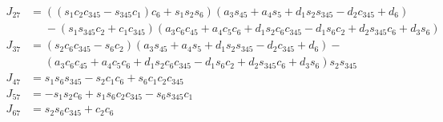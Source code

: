\documentclass{article}
\begin{document}
\begin{align*}
J_{27} &= \left(\left(s_{1} c_{2} c_{345} - s_{345} c_{1}\right) c_{6} + s_{1} s_{2} s_{6}\right) \left(a_{3} s_{45} + a_{4} s_{5} + d_{1} s_{2} s_{345} - d_{2} c_{345} + d_{6}\right) \\
       &\phantom{=}- \left(s_{1} s_{345} c_{2} + c_{1} c_{345}\right) \left(a_{3} c_{6} c_{45} + a_{4} c_{5} c_{6} + d_{1} s_{2} c_{6} c_{345} - d_{1} s_{6} c_{2} + d_{2} s_{345} c_{6} + d_{3} s_{6}\right) \\
J_{37} &= \left(s_{2} c_{6} c_{345} - s_{6} c_{2}\right) \left(a_{3} s_{45} + a_{4} s_{5} + d_{1} s_{2} s_{345} - d_{2} c_{345} + d_{6}\right) - \\
       &\phantom{=}\left(a_{3} c_{6} c_{45} + a_{4} c_{5} c_{6} + d_{1} s_{2} c_{6} c_{345} - d_{1} s_{6} c_{2} + d_{2} s_{345} c_{6} + d_{3} s_{6}\right) s_{2} s_{345} \\
J_{47} &= s_{1} s_{6} s_{345} - s_{2} c_{1} c_{6} + s_{6} c_{1} c_{2} c_{345} \\
J_{57} &= - s_{1} s_{2} c_{6} + s_{1} s_{6} c_{2} c_{345} - s_{6} s_{345} c_{1} \\
J_{67} &= s_{2} s_{6} c_{345} + c_{2} c_{6} \\
\end{align*}
\end{document}

